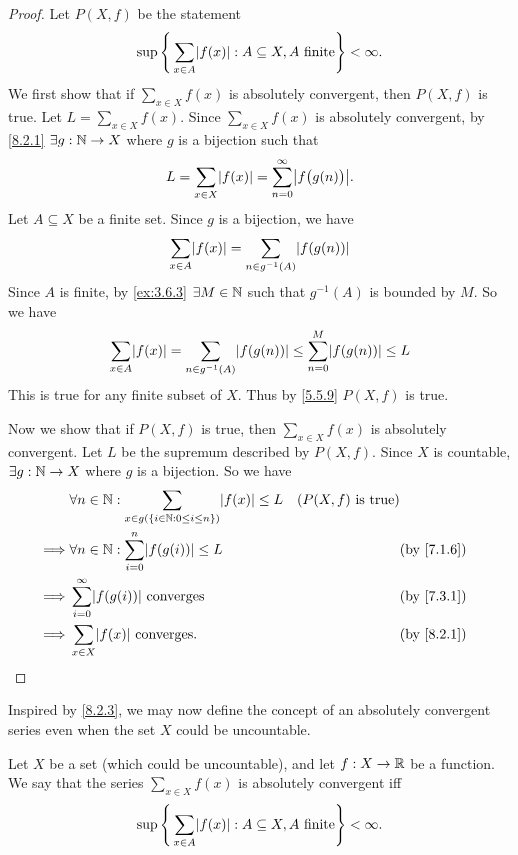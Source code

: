 \begin{proof}
  Let \(P(X, f)\) be the statement
  \[
    \sup\Bigg\{\sum_{x \in A} \abs{f(x)} : A \subseteq X, A \text{ finite}\Bigg\} < \infty.
  \]
  We first show that if \(\sum_{x \in X} f(x)\) is absolutely convergent, then \(P(X, f)\) is true.
  Let \(L = \sum_{x \in X} f(x)\).
  Since \(\sum_{x \in X} f(x)\) is absolutely convergent, by \cref{8.2.1} \(\exists g : \mathbb{N} \to X\) where \(g\) is a bijection such that
  \[
    L = \sum_{x \in X} \abs{f(x)} = \sum_{n = 0}^\infty \abs{f\big(g(n)\big)}.
  \]
  Let \(A \subseteq X\) be a finite set.
  Since \(g\) is a bijection, we have
  \[
    \sum_{x \in A} \abs{f(x)} = \sum_{n \in g^{-1}(A)} \abs{f(g(n))}
  \]
  Since \(A\) is finite, by \cref{ex:3.6.3} \(\exists M \in \mathbb{N}\) such that \(g^{-1}(A)\) is bounded by \(M\).
  So we have
  \[
    \sum_{x \in A} \abs{f(x)} = \sum_{n \in g^{-1}(A)} \abs{f(g(n))} \leq \sum_{n = 0}^M \abs{f(g(n))} \leq L
  \]
  This is true for any finite subset of \(X\).
  Thus by \cref{5.5.9} \(P(X, f)\) is true.

  Now we show that if \(P(X, f)\) is true, then \(\sum_{x \in X} f(x)\) is absolutely convergent.
  Let \(L\) be the supremum described by \(P(X, f)\).
  Since \(X\) is countable, \(\exists g : \mathbb{N} \to X\) where \(g\) is a bijection.
  So we have
  \begin{align*}
             & \forall n \in \N : \sum_{x \in g(\{i \in \N : 0 \leq i \leq n\})} \abs{f(x)} \leq L & (P(X, f) \text{ is true})              \\
    \implies & \forall n \in \N : \sum_{i = 0}^n \abs{f(g(i))} \leq L                              &                           & \by{7.1.6} \\
    \implies & \sum_{i = 0}^\infty \abs{f(g(i))} \text{ converges}                                 &                           & \by{7.3.1} \\
    \implies & \sum_{x \in X} \abs{f(x)} \text{ converges}.                                        &                           & \by{8.2.1}
  \end{align*}
\end{proof}

\begin{note}
  Inspired by \cref{8.2.3}, we may now define the concept of an absolutely convergent series even when the set \(X\) could be uncountable.
\end{note}

\begin{defn}\label{8.2.4}
  Let \(X\) be a set (which could be uncountable), and let \(f : X \to \mathbb{R}\) be a function.
  We say that the series \(\sum_{x \in X} f(x)\) is absolutely convergent iff
  \[
    \sup\Bigg\{\sum_{x \in A} \abs{f(x)} : A \subseteq X, A \text{ finite}\Bigg\} < \infty.
  \]
\end{defn}

